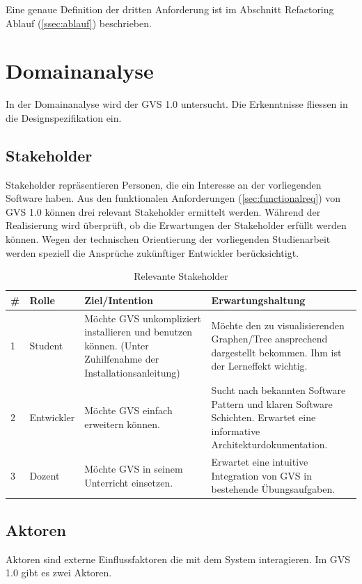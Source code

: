 \documentclass[11pt,a4paper,english,oneside]{book}
\numberwithin{equation}{chapter}
\begin{document}
	Eine genaue Definition der dritten Anforderung ist im Abschnitt Refactoring Ablauf (\ref{ssec:ablauf}) beschrieben.
	
	\section{Domainanalyse}
	In der Domainanalyse wird der GVS 1.0 untersucht. Die Erkenntnisse fliessen in die Designspezifikation ein.
		
	\subsection{Stakeholder}
	Stakeholder repräsentieren Personen, die ein Interesse an der vorliegenden Software haben. Aus den funktionalen Anforderungen (\ref{sec:functionalreq}) von GVS 1.0 können drei relevant Stakeholder ermittelt werden. Während der Realisierung wird überprüft, ob die Erwartungen der Stakeholder erfüllt werden können. Wegen der technischen Orientierung der vorliegenden Studienarbeit werden speziell die Ansprüche zukünftiger Entwickler berücksichtigt.
	
	\begin{table}[h!]
		\centering
		\begin{tabularx}{\linewidth}{l l X X}
			\toprule 
			\# & Rolle & Ziel/Intention & Erwartungshaltung \\
			\midrule
			1 & Student & Möchte GVS unkompliziert installieren und benutzen können. (Unter Zuhilfenahme der Installationsanleitung) & Möchte den zu visualisierenden Graphen/Tree ansprechend dargestellt bekommen. Ihm ist der Lerneffekt wichtig.  \\
			2 & Entwickler & Möchte GVS einfach erweitern können. & Sucht nach bekannten Software Pattern und klaren Software Schichten. Erwartet eine informative Architekturdokumentation. \\			
			3 & Dozent & Möchte GVS in seinem Unterricht einsetzen. & Erwartet eine intuitive Integration von GVS in bestehende Übungsaufgaben. \\
			\bottomrule 
		\end{tabularx} 
		\caption{Relevante Stakeholder} 
	\end{table}

	\subsection{Aktoren} \label{ssec:actors}
	Aktoren sind externe Einflussfaktoren die mit dem System interagieren. Im GVS 1.0 gibt es zwei Aktoren.
	
\end{document}
